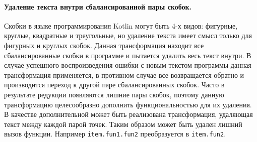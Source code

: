 \paragraph{Удаление текста внутри сбалансированной пары скобок.}
Скобки в языке программирования Kotlin могут быть 4-х видов: фигурные, круглые, квадратные и треугольные, но удаление текста имеет смысл только для фигурных и круглых скобок. Данная трансформация находит все сбалансированные скобки в программе и пытается удалить весь текст внутри. В случае успешного воспроизведения ошибки с новым текстом программы данная трансформация применяется, в противном случае все возвращается обратно и производится переход к другой паре сбалансированных скобок. Часто в результате редукции появляются лишние пары скобок, поэтому данную трансформацию целесообразно дополнить функциональностью для их удаления. В качестве дополнительной может быть реализована трансформация, удаляющая текст между каждой парой точек. Таким образом может быть удален лишний вызов функции. Например \texttt{item.fun1.fun2} преобразуется в \texttt{item.fun2}.

